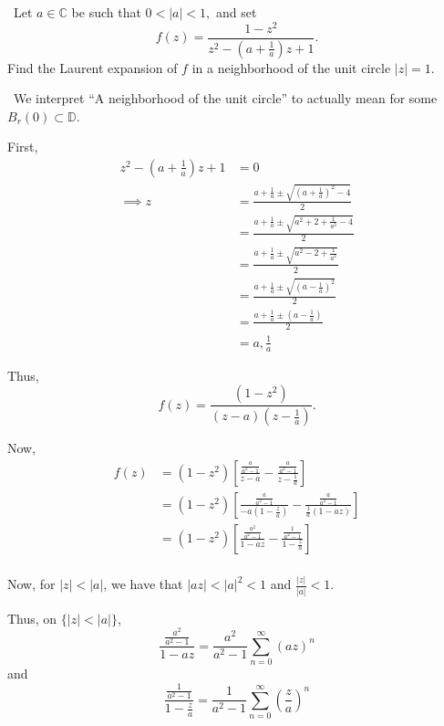 \documentclass[12pt]{Homework}
\begin{document}
\begin{problem} $\,$
Let $a\in\mathbb{C}$ be such that $0<|a|<1,$ and set $$f(z)=\frac{1-z^2}{z^2-(a+\frac{1}{a})z+1}.$$ Find the Laurent expansion of $f$ in a neighborhood of the unit circle $|z|=1.$
\end{problem}


\begin{solution}$\,$
We interpret ``A neighborhood of the unit circle'' to actually mean for some $B_r(0)\subset\mathbb{D}$.

First, \begin{align*}
    z^2-(a+\frac{1}{a})z+1&=0\\
    \implies z&=\frac{a+\frac{1}{a}\pm\sqrt{(a+\frac{1}{a})^2-4}}{2}\\
    &=\frac{a+\frac{1}{a}\pm\sqrt{a^2+2+\frac{1}{a^2}-4}}{2}\\
    &=\frac{a+\frac{1}{a}\pm\sqrt{a^2-2+\frac{1}{a^2}}}{2}\\
    &=\frac{a+\frac{1}{a}\pm\sqrt{(a-\frac{1}{a})^2}}{2}\\
    &=\frac{a+\frac{1}{a}\pm(a-\frac{1}{a})}{2}\\
    &=a,\frac{1}{a}
\end{align*}

Thus, $$f(z)=\frac{(1-z^2)}{(z-a)(z-\frac{1}{a})}.$$

Now, \begin{align*}
    f(z)&=(1-z^2)\left[\frac{\frac{a}{a^2-1}}{z-a}-\frac{\frac{a}{a^2-1}}{z-\frac{1}{a}}\right]\\
    &=(1-z^2)\left[\frac{\frac{a}{a^2-1}}{-a(1-\frac{z}{a})}-\frac{\frac{a}{a^2-1}}{\frac{1}{a}(1-az)}\right]\\
    &=(1-z^2)\left[\frac{\frac{a^2}{a^2-1}}{1-az}-\frac{\frac{1}{a^2-1}}{1-\frac{z}{a}}\right]\\
\end{align*}

Now, for $|z|<|a|$, we have that $|az|<|a|^2<1$ and $\frac{|z|}{|a|}<1$.

Thus, on $\{|z|<|a|\}$, $$\frac{\frac{a^2}{a^2-1}}{1-az}=\frac{a^2}{a^2-1}\sum_{n=0}^\infty(az)^n$$ and $$\frac{\frac{1}{a^2-1}}{1-\frac{z}{a}}=\frac{1}{a^2-1}\sum_{n=0}^\infty\left(\frac{z}{a}\right)^n$$


\end{solution}
\end{document}
